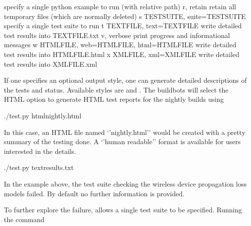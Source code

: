 \documentclass[letterpaper,10pt,english]{sphinxmanual}
\renewcommand{\sphinxcode}[1]{\texttt{\small{#1}}}
\begin{document}
\begin{sphinxVerbatim}[commandchars=\\\{\}]
                        specify a single python example to run (with relative
                        path)
  \PYGZhy{}r, \PYGZhy{}\PYGZhy{}retain          retain all temporary files (which are normally
                        deleted)
  \PYGZhy{}s TEST\PYGZhy{}SUITE, \PYGZhy{}\PYGZhy{}suite=TEST\PYGZhy{}SUITE
                        specify a single test suite to run
  \PYGZhy{}t TEXT\PYGZhy{}FILE, \PYGZhy{}\PYGZhy{}text=TEXT\PYGZhy{}FILE
                        write detailed test results into TEXT\PYGZhy{}FILE.txt
  \PYGZhy{}v, \PYGZhy{}\PYGZhy{}verbose         print progress and informational messages
  \PYGZhy{}w HTML\PYGZhy{}FILE, \PYGZhy{}\PYGZhy{}web=HTML\PYGZhy{}FILE, \PYGZhy{}\PYGZhy{}html=HTML\PYGZhy{}FILE
                        write detailed test results into HTML\PYGZhy{}FILE.html
  \PYGZhy{}x XML\PYGZhy{}FILE, \PYGZhy{}\PYGZhy{}xml=XML\PYGZhy{}FILE
                        write detailed test results into XML\PYGZhy{}FILE.xml
\end{sphinxVerbatim}

If one specifies an optional output style, one can generate detailed descriptions
of the tests and status.  Available styles are \sphinxcode{} and \sphinxcode{}.
The buildbots will select the HTML option to generate HTML test reports for the
nightly builds using

\begin{sphinxVerbatim}[commandchars=\\\{\}]
\PYGZdl{} ./test.py \PYGZhy{}\PYGZhy{}htmlnightly.html
\end{sphinxVerbatim}

In this case, an HTML file named ‘’nightly.html’’ would be created with a pretty
summary of the testing done.  A ‘’human readable’’ format is available for users
interested in the details.

\begin{sphinxVerbatim}[commandchars=\\\{\}]
\PYGZdl{} ./test.py \PYGZhy{}\PYGZhy{}textresults.txt
\end{sphinxVerbatim}

In the example above, the test suite checking the  wireless
device propagation loss models failed.  By default no further information is
provided.

To further explore the failure, \sphinxcode{} allows a single test suite
to be specified.  Running the command
\end{document}
